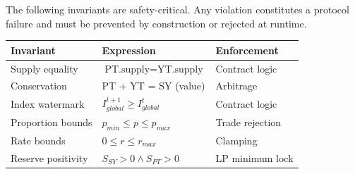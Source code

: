 The following invariants are safety-critical. Any violation constitutes a protocol failure and must be prevented by construction or rejected at runtime.

\begin{center}
\begin{tabularx}{\textwidth}{l >{\raggedright\arraybackslash}X l}
\toprule
\textbf{Invariant} & \textbf{Expression} & \textbf{Enforcement} \\
\midrule
Supply equality & $\text{PT.supply} = \text{YT.supply}$ & Contract logic \\
Conservation & PT + YT = SY (value) & Arbitrage \\
Index watermark & $I_{global}^{t+1} \geq I_{global}^{t}$ & Contract logic \\
Proportion bounds & $p_{min} \leq p \leq p_{max}$ & Trade rejection \\
Rate bounds & $0 \leq r \leq r_{max}$ & Clamping \\
Reserve positivity & $S_{SY} > 0 \land S_{PT} > 0$ & LP minimum lock \\
\bottomrule
\end{tabularx}
\end{center}
